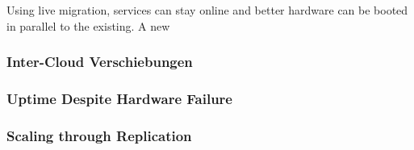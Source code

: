 \documentclass[a4paper,conference,compsoc]{IEEEtran}
\begin{document}
Using live migration, services can stay online and better hardware can
be booted in parallel to the existing. A new 

\subsubsection{Inter-Cloud Verschiebungen}
\label{sec:movclouds}

\blindtext

\subsubsection{Uptime Despite Hardware Failure}
\label{sec:hardfail}

\blindtext

\subsubsection{Scaling through Replication}

 

\end{document}
